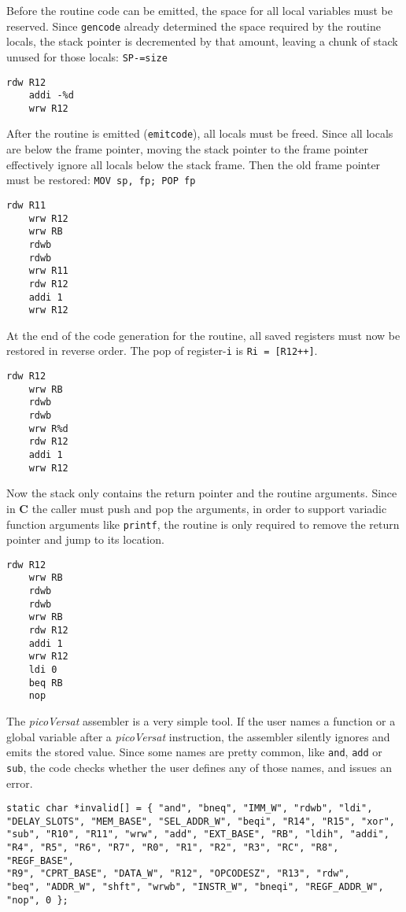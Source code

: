 Before the routine code can be emitted, the space for all
local variables must be reserved.
Since {\tt gencode} already determined the space
required by the routine locals, the stack pointer
is decremented by that amount, leaving a chunk
of stack unused for those locals: {\tt SP-=size}
\begin{Verbatim}[baselinestretch=1.2]
    rdw R12
    addi -%d
    wrw R12
\end{Verbatim}

After the routine is emitted ({\tt emitcode}),
all locals must be freed.
Since all locals are below the frame pointer,
moving the stack pointer to the frame pointer
effectively ignore all locals below the
stack frame.
Then the old frame pointer must be restored:
{\tt MOV sp, fp; POP fp}
\begin{Verbatim}[baselinestretch=1.2]
    rdw R11
    wrw R12
    wrw RB
    rdwb
    rdwb
    wrw R11
    rdw R12
    addi 1
    wrw R12
\end{Verbatim}

At the end of the code generation for the routine,
all saved registers must now be restored in reverse
order.
The pop of register-{\tt i} is {\tt Ri = [R12++]}.
\begin{Verbatim}[baselinestretch=1.2]
    rdw R12
    wrw RB
    rdwb
    rdwb
    wrw R%d
    rdw R12
    addi 1
    wrw R12
\end{Verbatim}

Now the stack only contains the return pointer
and the routine arguments.
Since in {\bf C} the caller must push and pop
the arguments, in order to support variadic
function arguments like {\tt printf}, the
routine is only required to remove the
return pointer and jump to its location.
\begin{Verbatim}[baselinestretch=1.2]
    rdw R12
    wrw RB
    rdwb
    rdwb
    wrw RB
    rdw R12
    addi 1
    wrw R12
    ldi 0
    beq RB
    nop
\end{Verbatim}

The {\it picoVersat} assembler is a very simple tool.
If the user names a function or a global variable
after a {\it picoVersat} instruction, the assembler
silently ignores and emits the stored value.
Since some names are pretty common, like {\tt and},
{\tt add} or {\tt sub}, the code checks whether
the user defines any of those names, and issues an
error.
\begin{Verbatim}[baselinestretch=1.2]
static char *invalid[] = { "and", "bneq", "IMM_W", "rdwb", "ldi",
"DELAY_SLOTS", "MEM_BASE", "SEL_ADDR_W", "beqi", "R14", "R15", "xor",
"sub", "R10", "R11", "wrw", "add", "EXT_BASE", "RB", "ldih", "addi",
"R4", "R5", "R6", "R7", "R0", "R1", "R2", "R3", "RC", "R8", "REGF_BASE",
"R9", "CPRT_BASE", "DATA_W", "R12", "OPCODESZ", "R13", "rdw",
"beq", "ADDR_W", "shft", "wrwb", "INSTR_W", "bneqi", "REGF_ADDR_W",
"nop", 0 };
\end{Verbatim}

